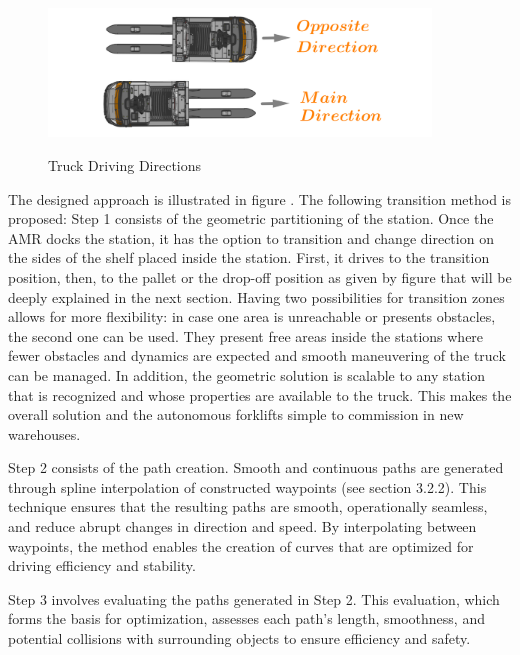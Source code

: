 \begin{figure}
    [!ht]
    \begin{center}
    \includegraphics[width=4in]{images/Chap2/driving_directions.png}\\
    \caption{Truck Driving Directions}
    \label{driving directions}
    \end{center}
\end{figure} 
 
The designed approach is illustrated in figure .
The following transition method is proposed: Step 1 consists of the geometric partitioning of the station.
Once the AMR docks the station, it has the option to transition and change 
direction on the sides of the shelf placed inside the station. First, it drives to the transition position, then, to the 
pallet or the drop-off position as given by figure  that will be deeply explained in the next section. 
Having two possibilities for transition zones allows 
for more flexibility: 
in case one area is unreachable or presents obstacles, the second one can be used. They present free areas 
inside the stations where fewer obstacles and dynamics are expected and smooth maneuvering of the truck can be managed. 
In addition, the geometric solution is scalable to 
any station that is recognized and whose properties are available to the truck. This makes the overall solution and the 
autonomous forklifts simple to
commission in new warehouses.

Step 2 consists of the path creation. Smooth and continuous paths are generated through spline interpolation of constructed waypoints (see section 3.2.2). 
This technique ensures 
that the resulting paths are smooth, operationally seamless, and reduce abrupt changes in direction and speed. 
By interpolating between waypoints, the method enables the creation of curves that are optimized for driving efficiency 
and stability.

Step 3 involves evaluating the paths generated in Step 2. This evaluation, which forms the basis for optimization, 
assesses each path's length, smoothness, and potential collisions with surrounding objects to ensure efficiency 
and safety.

